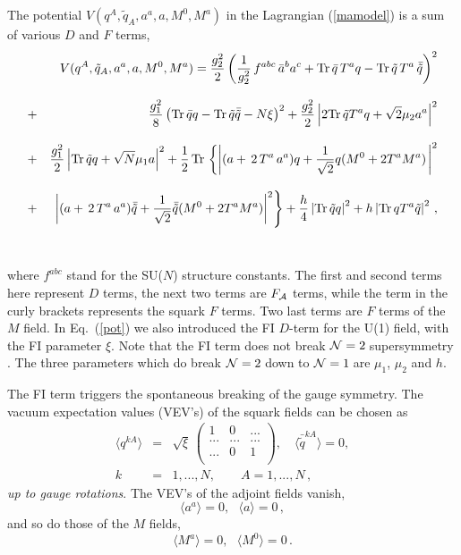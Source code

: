 \documentclass[epsfig,12pt]{article}
\def\beqn{\begin{eqnarray}}
\def\eeqn{\end{eqnarray}}
\def\beq{\begin{equation}}
\def\eeq{\end{equation}}
\newcommand{\ntwo}{${\cal N}=2\;$}
\newcommand{\none}{${\cal N}=1\;$}
\begin{document}
The potential $V(q^A,\tilde{q}_A,a^a,a,M^0,M^a)$ in the Lagrangian 
(\ref{mamodel}) is a sum of  various $D$ and  $F$  terms,
\beqn
& & V(q^A,\tilde{q}_A,a^a,a,M^0,M^a) =
 \frac{g^2_2}{2}
\left( \frac{1}{g^2_2}\,  f^{abc} \,\bar a^b a^c
 +
 {\rm Tr}\,\bar{q}\,T^a q -
{\rm Tr}\,\tilde{q}\, T^a\,\bar{\tilde{q}}\right)^2
\nonumber\\[3mm]
&+& \frac{g^2_1}{8}
\left({\rm Tr}\,\bar{q} q - {\rm Tr}\,\tilde{q} \bar{\tilde{q}}-
N\xi\right)^2+
\frac{g^2_2}{2}\left| 2{\rm Tr}\,\tilde{q}T^a q +\sqrt{2}\mu_2 a^a\right|^2
\nonumber\\[3mm]
&+& 
\frac{g^2_1}{2}\left| {\rm Tr}\,\tilde{q} q +\sqrt{N}\mu_1 a \right|^2
+\frac12 \,{\rm Tr}\, \left\{ \left|(a +\,2\,T^a\, a^a)q +
\frac1{\sqrt{2}}q(M^0 +2T^a M^a)
\right.
\right|^2
\nonumber\\[3mm]
&+& 
\left.
\left|(a +\,2\,T^a\, a^a)\bar{\tilde{q}}
+\frac1{\sqrt{2}}\bar{\tilde{q}}(M^0 +2T^a M^a)
\right|^2 \right\}
+\frac{h}{4}\left|{\rm Tr}\,\tilde{q}q\right|^2 
+h\left|{\rm Tr}\,qT^a\tilde{q}\right|^2 
\,,
\nonumber\\[3mm]
&&\mbox{}
\label{pot}
\eeqn
where $f^{abc}$ stand for the SU($N$) structure constants.
The first and second terms  here represent   $D$   terms, 
the next two terms are $F_{\cal A}$ terms,
while the term in the curly brackets represents the squark $F$ terms.
Two last terms are $F$ terms of the $M$ field.
In Eq.~(\ref{pot}) we also introduced the FI $D$-term for the U(1) field,
with the FI parameter $\xi$.
Note that the FI term does not
break \ntwo supersymmetry \cite{HSZ,VY}. The three parameters which do
break  \ntwo   down to \none are $\mu_1$, $\mu_2$ and $h$.

The FI term triggers the spontaneous breaking
of the gauge symmetry. The vacuum expectation values (VEV's)
of the squark fields can be chosen as
\beqn
\langle q^{kA}\rangle &=&\sqrt{
\xi}\, \left(
\begin{array}{ccc}
1 & 0 & ...\\
... & ... & ... \\
... & 0 & 1  \\
\end{array}
\right),\,\,\,\,\,\,\langle \bar{\tilde{q}}^{kA}\rangle =0,
\nonumber\\[3mm]
k&=&1,...,N,\qquad A=1,...,N\,,
\label{qvev}
\eeqn
{\em up to gauge rotations}.
The VEV's of the adjoint fields vanish,
\beq
\langle a^a\rangle =0,\,\,\,\,\langle a\rangle =0\,,
\label{avev}
\eeq
and so do those of the $M$ fields,
\beq
\langle M^a\rangle =0,\,\,\,\,\langle M^0\rangle =0\,.
\label{Mvev}
\eeq
\end{document}
